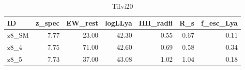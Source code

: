 \begin{table}[H]
\caption{Tilvi20}
\label{Tilvi20}
\begin{tabular}{lrrrrrr}
\toprule
ID & z_spec & EW_rest & logLLya & HII_radii & R_s & f_esc_Lya \\
\midrule
z8_SM & 7.77 & 23.00 & 42.30 & 0.55 & 0.67 & 0.11 \\
z8_4 & 7.75 & 71.00 & 42.60 & 0.69 & 0.58 & 0.34 \\
z8_5 & 7.73 & 37.00 & 43.08 & 1.02 & 1.04 & 0.18 \\
\bottomrule
\end{tabular}
\end{table}
